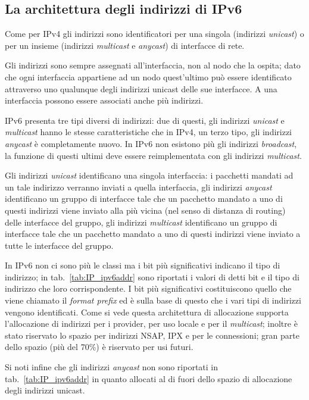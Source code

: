 \subsection{La architettura degli indirizzi di IPv6}
\label{sec:IP_ipv6_addr_arch}

Come per IPv4 gli indirizzi sono identificatori per una singola (indirizzi
\textit{unicast}) o per un insieme (indirizzi \textit{multicast} e
\textit{anycast}) di interfacce di rete.

Gli indirizzi sono sempre assegnati all'interfaccia, non al nodo che la
ospita; dato che ogni interfaccia appartiene ad un nodo quest'ultimo può
essere identificato attraverso uno qualunque degli indirizzi unicast delle sue
interfacce. A una interfaccia possono essere associati anche più indirizzi.

IPv6 presenta tre tipi diversi di indirizzi: due di questi, gli indirizzi
\textit{unicast} e \textit{multicast} hanno le stesse caratteristiche che in
IPv4, un terzo tipo, gli indirizzi \textit{anycast} è completamente nuovo.  In
IPv6 non esistono più gli indirizzi \textit{broadcast}, la funzione di questi
ultimi deve essere reimplementata con gli indirizzi \textit{multicast}.

Gli indirizzi \textit{unicast} identificano una singola interfaccia: i
pacchetti mandati ad un tale indirizzo verranno inviati a quella interfaccia,
gli indirizzi \textit{anycast} identificano un gruppo di interfacce tale che
un pacchetto mandato a uno di questi indirizzi viene inviato alla più vicina
(nel senso di distanza di routing) delle interfacce del gruppo, gli indirizzi
\textit{multicast} identificano un gruppo di interfacce tale che un pacchetto
mandato a uno di questi indirizzi viene inviato a tutte le interfacce del
gruppo.

In IPv6 non ci sono più le classi ma i bit più significativi indicano il tipo
di indirizzo; in tab.~\ref{tab:IP_ipv6addr} sono riportati i valori di detti
bit e il tipo di indirizzo che loro corrispondente.  I bit più significativi
costituiscono quello che viene chiamato il \textit{format prefix} ed è sulla
base di questo che i vari tipi di indirizzi vengono identificati.  Come si
vede questa architettura di allocazione supporta l'allocazione di indirizzi
per i provider, per uso locale e per il \textit{multicast}; inoltre è stato
riservato lo spazio per indirizzi NSAP, IPX e per le connessioni; gran parte
dello spazio (più del 70\%) è riservato per usi futuri.

Si noti infine che gli indirizzi \textit{anycast} non sono riportati in
tab.~\ref{tab:IP_ipv6addr} in quanto allocati al di fuori dello spazio di
allocazione degli indirizzi unicast.

